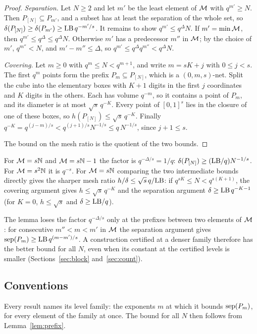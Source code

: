\begin{proof}
\emph{Separation.} Let $N\ge2$ and let $m'$ be the least element of $\mathcal{M}$ with $q^{m'}\ge N$. Then $P_{[N]}\subseteq P_{m'}$, and a subset has at least the separation of the whole set, so $\delta(P_{[N]})\ge\delta(P_{m'})\ge\mathrm{LB}\,q^{-m'/s}$. It remains to show $q^{m'}\le q^{\Delta}N$. If $m'=\min\mathcal{M}$, then $q^{m'}\le q^{\Delta}\le q^{\Delta}N$. Otherwise $m'$ has a predecessor $m''$ in $\mathcal{M}$; by the choice of $m'$, $q^{m''}<N$, and $m'-m''\le\Delta$, so $q^{m'}\le q^{\Delta}q^{m''}<q^{\Delta}N$.

\emph{Covering.} Let $m\ge0$ with $q^m\le N<q^{m+1}$, and write $m=sK+j$ with $0\le j<s$. The first $q^m$ points form the prefix $P_m\subseteq P_{[N]}$, which is a $(0,m,s)$-net. Split the cube into the elementary boxes with $K+1$ digits in the first $j$ coordinates and $K$ digits in the others. Each has volume $q^{-m}$, so it contains a point of $P_m$, and its diameter is at most $\sqrt s\,q^{-K}$. Every point of $[0,1]^s$ lies in the closure of one of these boxes, so $h(P_{[N]})\le\sqrt s\,q^{-K}$. Finally $q^{-K}=q^{(j-m)/s}<q^{(j+1)/s}N^{-1/s}\le q\,N^{-1/s}$, since $j+1\le s$.

The bound on the mesh ratio is the quotient of the two bounds.
\end{proof}

\begin{remark}\label{rem:prefixcases}
For $\mathcal{M}=s\mathbb{N}$ and $\mathcal{M}=s\mathbb{N}-1$ the factor is $q^{-\Delta/s}=1/q$: $\delta(P_{[N]})\ge(\mathrm{LB}/q)N^{-1/s}$. For $\mathcal{M}=s^2\mathbb{N}$ it is $q^{-s}$. For $\mathcal{M}=s\mathbb{N}$ comparing the two intermediate bounds directly gives the sharper mesh ratio $h/\delta\le\sqrt s\,q/\mathrm{LB}$: if $q^{sK}\le N<q^{s(K+1)}$, the covering argument gives $h\le\sqrt s\,q^{-K}$ and the separation argument $\delta\ge\mathrm{LB}\,q^{-K-1}$ (for $K=0$, $h\le\sqrt s$ and $\delta\ge\mathrm{LB}/q$).
\end{remark}

The lemma loses the factor $q^{-\Delta/s}$ only at the prefixes between two elements of $\mathcal{M}$: for consecutive $m''<m<m'$ in $\mathcal{M}$ the separation argument gives $\operatorname{sep}(P_m)\ge\mathrm{LB}\,q^{(m-m')/s}$. A construction certified at a denser family therefore has the better bound for all $N$, even when its constant at the certified levels is smaller (Sections~\ref{sec:block} and~\ref{sec:count}).

\subsection{Conventions}\label{sec:conventions}
Every result names its level family: the exponents $m$ at which it bounds $\operatorname{sep}(P_m)$, for every element of the family at once. The bound for all $N$ then follows from Lemma~\ref{lem:prefix}.

